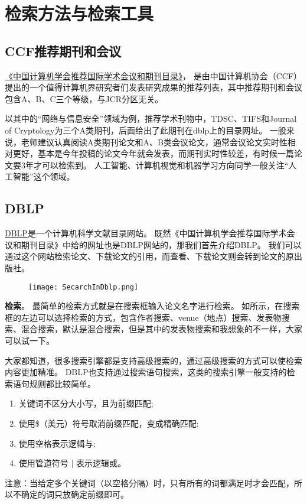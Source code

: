 \documentclass[lang=cn,11pt,a4paper]{elegantpaper}
\begin{document}
\section{检索方法与检索工具}
\subsection{CCF推荐期刊和会议}
\href{https://www.ccf.org.cn/Academic_Evaluation/By_category/}{《中国计算机学会推荐国际学术会议和期刊目录》}，
是由中国计算机协会（CCF）提出的一个值得计算机界研究者们发表研究成果的推荐列表，其中推荐期刊和会议包含A、B、C三个等级，与JCR分区无关。

以其中的“网络与信息安全”领域为例，推荐学术刊物中，TDSC、TIFS和Journal of Cryptology为三个A类期刊，后面给出了此期刊在dblp上的目录网址。
一般来说，老师建议认真阅读A类期刊论文和A、B类会议论文，通常会议论文实时性相对更好，基本是今年投稿的论文今年就会发表，而期刊实时性较差，有时候一篇论文要3年才可以检索到。
人工智能、计算机视觉和机器学习方向同学一般关注“人工智能”这个领域。

\subsection{DBLP}
\href{https://dblp.org/}{DBLP}是一个计算机科学文献目录网站。
既然《中国计算机学会推荐国际学术会议和期刊目录》中给的网址也是DBLP网站的，那我们首先介绍DBLP。
我们可以通过这个网站检索论文、下载论文的引用，而查看、下载论文则会转到论文的原出版社。
\begin{figure}[!htb]
\centering
\texttt{[image: SecarchInDblp.png]}
\caption{}
\label{fig.search_in_dblp}
\end{figure}

\textbf{检索}。
最简单的检索方式就是在搜索框输入论文名字进行检索。
如所示，在搜索框的左边可以选择检索的方式，包含作者搜索、venue（地点）搜索、发表物搜索、混合搜索，默认是混合搜索，但是其中的发表物搜索和我想象的不一样，大家可以试一下。

大家都知道，很多搜索引擎都是支持高级搜索的，通过高级搜索的方式可以使检索内容更加精准。
DBLP也支持通过搜索语句搜索，这类的搜索引擎一般支持的检索语句规则都比较简单。
\begin{enumerate}
  \item 关键词不区分大小写，且为前缀匹配;
  \item 使用\$（美元）符号取消前缀匹配，变成精确匹配;
  \item 使用空格表示逻辑与;
  \item 使用管道符号 $|$ 表示逻辑或。
\end{enumerate}
注意：当给定多个关键词（以空格分隔）时，只有所有的词都满足时才会匹配，所以不确定的词只放确定前缀即可。
\end{document}
